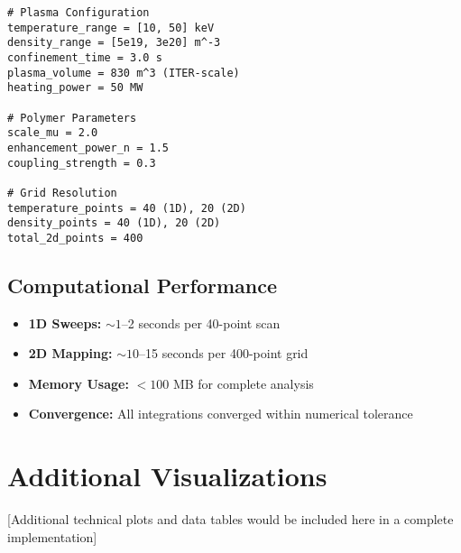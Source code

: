 \documentclass[12pt,a4paper]{article}
\begin{document}
\begin{verbatim}
# Plasma Configuration
temperature_range = [10, 50] keV
density_range = [5e19, 3e20] m^-3
confinement_time = 3.0 s
plasma_volume = 830 m^3 (ITER-scale)
heating_power = 50 MW

# Polymer Parameters  
scale_mu = 2.0
enhancement_power_n = 1.5
coupling_strength = 0.3

# Grid Resolution
temperature_points = 40 (1D), 20 (2D)
density_points = 40 (1D), 20 (2D)
total_2d_points = 400
\end{verbatim}

\subsection{Computational Performance}

\begin{itemize}
    \item \textbf{1D Sweeps:} $\sim 1$--2 seconds per 40-point scan
    \item \textbf{2D Mapping:} $\sim 10$--15 seconds per 400-point grid
    \item \textbf{Memory Usage:} $< 100$ MB for complete analysis
    \item \textbf{Convergence:} All integrations converged within numerical tolerance
\end{itemize}

\section{Additional Visualizations}

[Additional technical plots and data tables would be included here in a complete implementation]
\end{document}
